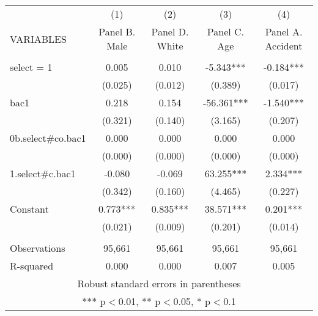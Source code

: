 \begin{tabular}{lcccc} \hline
 & (1) & (2) & (3) & (4) \\
VARIABLES & Panel B. Male & Panel D. White & Panel C. Age & Panel A. Accident \\ \hline
 &  &  &  &  \\
select = 1 & 0.005 & 0.010 & -5.343*** & -0.184*** \\
 & (0.025) & (0.012) & (0.389) & (0.017) \\
bac1 & 0.218 & 0.154 & -56.361*** & -1.540*** \\
 & (0.321) & (0.140) & (3.165) & (0.207) \\
0b.select\#co.bac1 & 0.000 & 0.000 & 0.000 & 0.000 \\
 & (0.000) & (0.000) & (0.000) & (0.000) \\
1.select\#c.bac1 & -0.080 & -0.069 & 63.255*** & 2.334*** \\
 & (0.342) & (0.160) & (4.465) & (0.227) \\
Constant & 0.773*** & 0.835*** & 38.571*** & 0.201*** \\
 & (0.021) & (0.009) & (0.201) & (0.014) \\
 &  &  &  &  \\
Observations & 95,661 & 95,661 & 95,661 & 95,661 \\
 R-squared & 0.000 & 0.000 & 0.007 & 0.005 \\ \hline
\multicolumn{5}{c}{ Robust standard errors in parentheses} \\
\multicolumn{5}{c}{ *** p$<$0.01, ** p$<$0.05, * p$<$0.1} \\
\end{tabular}
